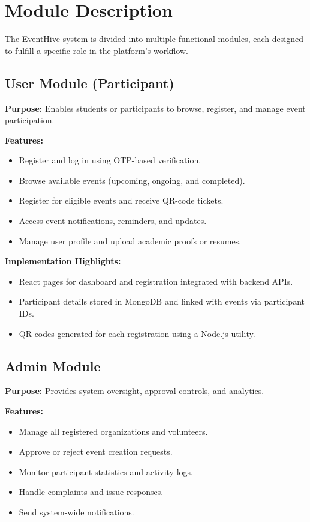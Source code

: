 \documentclass[12pt,a4paper]{report}
\begin{document}
\section{Module Description}

The EventHive system is divided into multiple functional modules, each designed to fulfill a specific role in the platform’s workflow.

\subsection{User Module (Participant)}

\textbf{Purpose:} Enables students or participants to browse, register, and manage event participation.

\textbf{Features:}
\begin{itemize}
    \item Register and log in using OTP-based verification.
    \item Browse available events (upcoming, ongoing, and completed).
    \item Register for eligible events and receive QR-code tickets.
    \item Access event notifications, reminders, and updates.
    \item Manage user profile and upload academic proofs or resumes.
\end{itemize}

\textbf{Implementation Highlights:}
\begin{itemize}
    \item React pages for dashboard and registration integrated with backend APIs.
    \item Participant details stored in MongoDB and linked with events via participant IDs.
    \item QR codes generated for each registration using a Node.js utility.
\end{itemize}

\subsection{Admin Module}

\textbf{Purpose:} Provides system oversight, approval controls, and analytics.

\textbf{Features:}
\begin{itemize}
    \item Manage all registered organizations and volunteers.
    \item Approve or reject event creation requests.
    \item Monitor participant statistics and activity logs.
    \item Handle complaints and issue responses.
    \item Send system-wide notifications.
\end{itemize}
\end{document}
